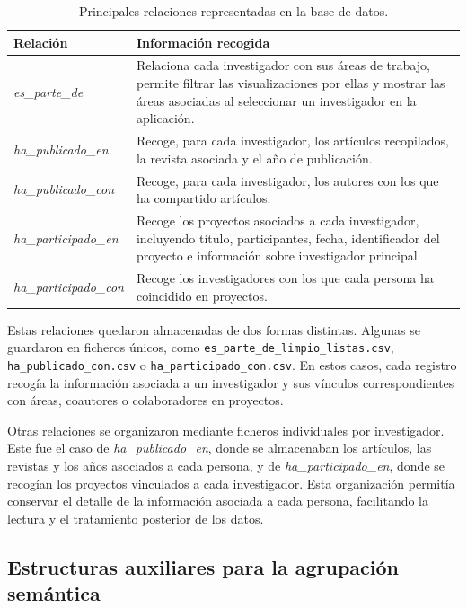 \documentclass[11pt,spanish,listoffigures,listoftables]{tfgetsinf}
\begin{document}
\begin{table}[H]
\centering
\small
\renewcommand{\arraystretch}{1.25}
\begin{tabularx}{\textwidth}{
>{\raggedright\arraybackslash}p{4cm}
>{\raggedright\arraybackslash}X
}
\toprule
\textbf{Relación} & \textbf{Información recogida} \\
\midrule
\textit{es\_parte\_de} 
& Relaciona cada investigador con sus áreas de trabajo, permite filtrar las visualizaciones por ellas y mostrar las áreas asociadas al seleccionar un investigador en la aplicación. \\
\midrule
\textit{ha\_publicado\_en} 
& Recoge, para cada investigador, los artículos recopilados, la revista asociada y el año de publicación. \\
\midrule
\textit{ha\_publicado\_con} 
& Recoge, para cada investigador, los autores con los que ha compartido artículos. \\
\midrule
\textit{ha\_participado\_en} 
& Recoge los proyectos asociados a cada investigador, incluyendo título, participantes, fecha, identificador del proyecto e información sobre investigador principal. \\
\midrule
\textit{ha\_participado\_con} 
& Recoge los investigadores con los que cada persona ha coincidido en proyectos. \\
\bottomrule
\end{tabularx}
\caption{Principales relaciones representadas en la base de datos.}
\end{table}

Estas relaciones quedaron almacenadas de dos formas distintas. Algunas se guardaron en ficheros únicos, como \texttt{es\_parte\_de\_limpio\_listas.csv}, \texttt{ha\_publicado\_con.csv} o \texttt{ha\_participado\_con.csv}. En estos casos, cada registro recogía la información asociada a un investigador y sus vínculos correspondientes con áreas, coautores o colaboradores en proyectos.

Otras relaciones se organizaron mediante ficheros individuales por investigador. Este fue el caso de \textit{ha\_publicado\_en}, donde se almacenaban los artículos, las revistas y los años asociados a cada persona, y de \textit{ha\_participado\_en}, donde se recogían los proyectos vinculados a cada investigador. Esta organización permitía conservar el detalle de la información asociada a cada persona, facilitando la lectura y el tratamiento posterior de los datos.

\subsection{Estructuras auxiliares para la agrupación semántica}
\end{document}
